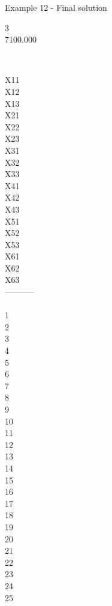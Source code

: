 \begin{frame}{Example 12 - Final solution}

  3\\
  7100.000\\

\begin{columns}[t]
\begin{column}{0.3\textwidth}
\\
X11\\
X12\\
X13\\
X21\\
X22\\
X23\\
X31\\
X32\\
X33\\
X41\\
X42\\
X43\\
X51\\
X52\\
X53\\
X61\\
X62\\
X63\\
-----------\\
\\
1\\
2\\
3\\
4\\
5\\
6\\
7\\
8\\
9\\
10\\
11\\
12\\
13\\
14\\
15\\
16\\
17\\
18\\
19\\
20\\
21\\
22\\
23\\
24\\
25\\




\end{column}
\end{columns}
\end{frame}
